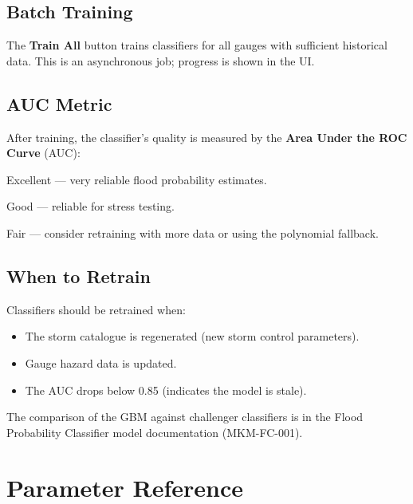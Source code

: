 \documentclass[11pt,a4paper]{article}
\begin{document}
\subsection{Batch Training}

The \textbf{Train All} button trains classifiers for all gauges with
sufficient historical data.  This is an asynchronous job; progress is
shown in the UI.

\subsection{AUC Metric}

After training, the classifier's quality is measured by the
\textbf{Area Under the ROC Curve} (AUC):
\begin{description}[leftmargin=2em]
  \item[$> 0.95$] Excellent --- very reliable flood probability
        estimates.
  \item[$0.85$--$0.95$] Good --- reliable for stress testing.
  \item[$< 0.85$] Fair --- consider retraining with more data or
        using the polynomial fallback.
\end{description}

\subsection{When to Retrain}

Classifiers should be retrained when:
\begin{itemize}
  \item The storm catalogue is regenerated (new storm control
        parameters).
  \item Gauge hazard data is updated.
  \item The AUC drops below 0.85 (indicates the model is stale).
\end{itemize}

\noindent The comparison of the GBM against challenger classifiers is in the
Flood Probability Classifier model documentation (MKM-FC-001).


\section{Parameter Reference}
\label{ch:reference}
\end{document}
